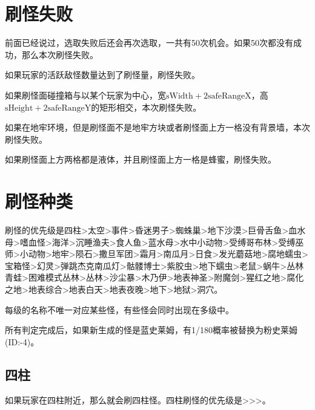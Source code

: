 \section{刷怪失败}
前面已经说过，选取失败后还会再次选取，一共有50次机会。如果50次都没有成功，那么本次刷怪失败。

如果玩家的活跃敌怪数量达到了刷怪量，刷怪失败。

如果刷怪面碰撞箱与以某个玩家为中心，宽$\textrm{sWidth}+2\textrm{safeRangeX}$，高$\textrm{sHeight}+2\textrm{safeRangeY}$的矩形相交，本次刷怪失败。

如果在地牢环境，但是刷怪面不是地牢方块或者刷怪面上方一格没有背景墙，本次刷怪失败。

如果刷怪面上方两格都是液体，并且刷怪面上方一格是蜂蜜，刷怪失败。

\section{刷怪种类}
刷怪的优先级是四柱>太空>事件>昏迷男子>蜘蛛巢>地下沙漠>巨骨舌鱼>血水母>嗜血怪>海洋>沉睡渔夫>食人鱼>蓝水母>水中小动物>受缚哥布林>受缚巫师>小动物>地牢>陨石>撒旦军团>霜月>南瓜月>日食>发光蘑菇地>腐地蠕虫>宝箱怪>幻灵>弹跳杰克南瓜灯>骷髅博士>紫胶虫>地下蠕虫>老鼠>蜗牛>丛林青蛙>困难模式丛林>丛林>沙尘暴>木乃伊>地表神圣>附魔剑>猩红之地>腐化之地>地表综合>地表白天>地表夜晚>地下>地狱>洞穴。

每级的名称不唯一对应某些怪，有些怪会同时出现在多级中。

所有判定完成后，如果新生成的怪是蓝史莱姆，有1/180概率被替换为粉史莱姆(ID:-4)。

\subsection{四柱}
如果玩家在四柱附近，那么就会刷四柱怪。四柱刷怪的优先级是>>>。

